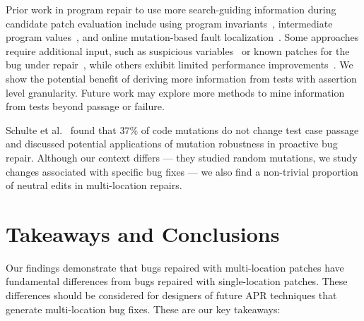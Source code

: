 \documentclass[10pt, conference]{IEEEtran}
\begin{document}
Prior work in program repair to use more search-guiding information 
during candidate patch evaluation 
include using program invariants~\cite{better-fitness, dinglyu}, 
intermediate program values~\cite{source-code-checkpoint}, 
and online mutation-based fault localization~\cite{mut-analysis}.
Some approaches require additional input, such as suspicious variables~\cite{source-code-checkpoint} 
or known patches for the bug under repair~\cite{better-fitness}, 
while others exhibit limited performance improvements~\cite{dinglyu, mut-analysis}.
We show the potential benefit of deriving more information from tests
with assertion level granularity.
Future work may explore more methods to mine information from tests 
beyond passage or failure.

Schulte et al.~\cite{schulte} found that 37\% of code mutations 
do not change test case passage and discussed potential applications 
of mutation robustness in proactive bug repair. 
Although our context differs --- they studied random mutations, 
we study changes associated with specific bug fixes --- we also find a 
non-trivial proportion of neutral edits in multi-location repairs.  


\section{Takeaways and Conclusions}
\label{sec:takeaways}

Our findings demonstrate that bugs repaired with multi-location patches have
fundamental differences from bugs repaired with single-location patches. These
differences should be considered for designers of future APR techniques that
generate multi-location bug fixes. These are our key takeaways:
\end{document}

